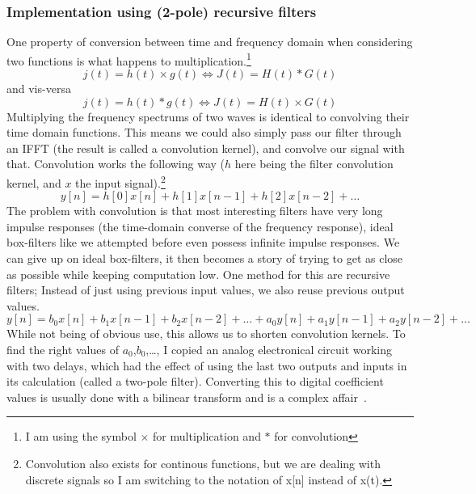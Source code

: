 \documentclass[11pt,a4paper]{article}
\begin{document}
\subsubsection{Implementation using (2-pole) recursive filters}

One property of conversion between time and frequency domain when considering two functions is what happens to multiplication.\footnote{I am using the symbol $\times$ for multiplication and $*$ for convolution}
\begin{equation}
j(t) = h(t) \times g(t) \iff J(t) = H(t) * G(t)
\end{equation}
and vis-versa
\begin{equation}
j(t) = h(t) * g(t) \iff J(t) = H(t) \times G(t)
\end{equation}
Multiplying the frequency spectrums of two waves is identical to convolving their time domain functions.
This means we could also simply pass our filter through an IFFT (the result is called a convolution kernel), and convolve our signal with that.
Convolution works the following way ($h$ here being the filter convolution kernel, and $x$ the input signal).\footnote{Convolution also exists for continous functions, but we are dealing with discrete signals so I am switching to the notation of x[n] instead of x(t).}
\begin{equation}
y[n] = h[0]x[n] + h[1]x[n-1] + h[2]x[n-2] + \dots
\end{equation}
The problem with convolution is that most interesting filters have very long impulse responses (the time-domain converse of the frequency response), ideal box-filters like we attempted before even possess infinite impulse responses.
We can give up on ideal box-filters, it then becomes a story of trying to get as close as possible while keeping computation low. One method for this are recursive filters; Instead of just using previous input values, we also reuse previous output values.
\begin{equation}
y[n] = b_0x[n] + b_1x[n-1] + b_2x[n-2] + \dots + a_0y[n] + a_1y[n-1] + a_2y[n-2] + \dots
\end{equation}
While not being of obvious use, this allows us to shorten convolution kernels. To find the right values of $a_0$,$b_0$,\dots, I copied an analog electronical circuit working with two delays, which had the effect of using the last two outputs and inputs in its calculation (called a two-pole filter). Converting this to digital coefficient values is usually done with a bilinear transform and is a complex affair~\cite[chap. 3.5]{ZoranDFD}.
\end{document}
